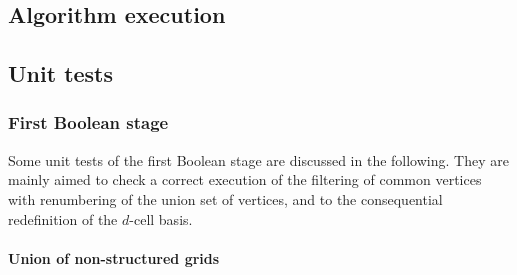 \documentclass[11pt,oneside]{article}	%
\begin{document}
\subsection{Algorithm execution}
\subsection{Unit tests}

\subsubsection{First Boolean stage}

Some unit tests of the first Boolean stage are discussed in the following. They are mainly aimed to check a correct execution of the filtering of common vertices with renumbering of the union set of vertices, and to the consequential redefinition of the $d$-cell basis.

\paragraph{Union of non-structured grids}
\end{document}
